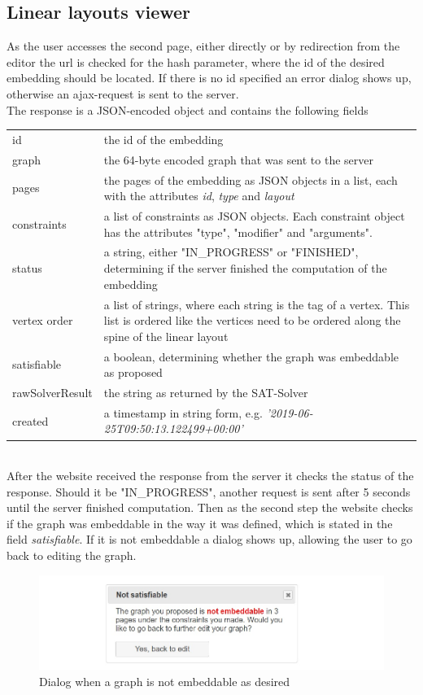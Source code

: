 \subsection{Linear layouts viewer}
\label{viewerOV}
As the user accesses the second page, either directly or by redirection from the editor the url is checked for the hash parameter, where the id of the desired embedding should be located. If there is no id specified an error dialog shows up, otherwise an ajax-request is sent to the server.\\
The response is a JSON-encoded object and contains the following fields \cite{linearLayoutApi}\\[12pt]
\begin{tabular}{l p{}}
id & the id of the embedding\\
graph & the 64-byte encoded graph that was sent to the server\\
pages & the pages of the embedding as JSON objects in a list, each with the attributes \textit{id}, \textit{type} and \textit{layout}\\
constraints & a list of constraints as JSON objects. Each constraint object has the attributes "type", "modifier" and "arguments".\\
status & a string, either "IN\_PROGRESS" or "FINISHED", determining if the server finished the computation of the embedding\\
vertex order & a list of strings, where each string is the tag of a vertex. This list is ordered like the vertices need to be ordered along the spine of the linear layout\\
satisfiable & a boolean, determining whether the graph was embeddable as proposed\\
rawSolverResult & the string as returned by the SAT-Solver\\
created & a timestamp in string form, e.g. \textit{'2019-06-25T09:50:13.122499+00:00'}
\end{tabular}\\[12pt]
After the website received the response from the server it checks the status of the response. Should it be "IN\_PROGRESS", another request is sent after 5 seconds until the server finished computation. Then as the second step the website checks if the graph was embeddable in the way it was defined, which is stated in the field \textit{satisfiable}. If it is not embeddable a dialog shows up, allowing the user to go back to editing the graph.\\
\begin{figure}
\begin{center}
\includegraphics[width=\textwidth]{figures/figSecond/NotEmbeddable.jpg}
\caption{Dialog when a graph is not embeddable as desired}
\end{center}
\label{notSat}
\end{figure}
